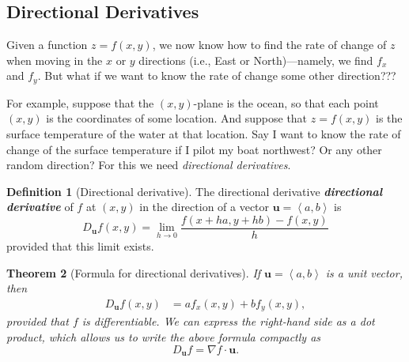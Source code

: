 \documentclass[10pt]{article}
\DeclareRobustCommand{\demph}[1]{%
  \ifmmode
  {\color{Blue}#1}%
  \else
  {\color{Blue}\bfseries\slshape #1}%
  \fi
}
\newtheorem{theorem}{Theorem}
\theoremstyle{definition}
\newtheorem{definition}[theorem]{Definition}
\newcommand{\1}[1]{\textbf{1}_{\left[#1\right]}} %
\begin{document}
\subsection{Directional Derivatives}
Given a function $z=f(x,y)$, we now know how to find the rate of change of $z$
when moving in the $x$ or $y$ directions (i.e., East or North)---namely, we
find $f_{x}$ and $f_{y}$. But what if we want to know the rate of change some
other direction???

For example, suppose that the $(x,y)$-plane is the ocean, so that each point
$(x,y)$ is the coordinates of some location. And suppose that $z=f(x,y)$ is
the surface temperature of the water at that location. Say I want to know the
rate of change of the surface temperature if I pilot my boat northwest? Or any
other random direction? For this we need \textit{directional derivatives}.

\begin{definition}[Directional derivative]
  The \demph{directional derivative} of $f$ at $(x,y)$ in the
  direction of a vector $\boldsymbol{u}=\left\langle a,b \right\rangle$ is
  \begin{equation*}
    D_{\boldsymbol{u}}f(x,y) = \lim_{h \to 0} \frac{f(x+ha,y+hb)-f(x,y)}{h} 
  \end{equation*}
  provided that this limit exists.
\end{definition}

\begin{theorem}[Formula for directional derivatives]
  \label{thm:formula-for-directiona-derivatives}
  If $\boldsymbol{u}= \left\langle a,b \right\rangle$ is a unit vector, then
  \begin{align*}
    D_{\boldsymbol{u}}f(x,y) 
    &= af_{x}(x,y)+ bf_{y}(x,y),
  \end{align*}
  provided that $f$ is differentiable. We can express the right-hand side as a
  dot product, which allows us to write the above formula compactly as
  \begin{equation*}
    D_{\boldsymbol{u}}f = \nabla f \cdot \boldsymbol{u}.
  \end{equation*}
\end{theorem}
\end{document}
